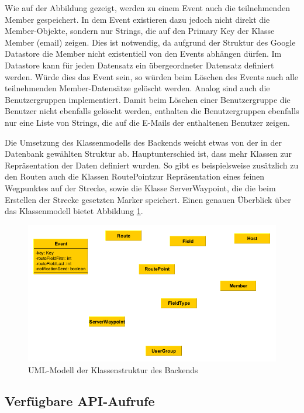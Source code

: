 Wie auf der Abbildung gezeigt, werden zu einem Event auch die teilnehmenden Member gespeichert. In dem Event existieren dazu jedoch nicht direkt die Member-Objekte, sondern nur Strings, die auf den Primary Key der Klasse Member (\glqq email\grqq) zeigen. Dies ist notwendig, da aufgrund der Struktur des Google Datastore die Member nicht existentiell von den Events abhängen dürfen. Im Datastore kann für jeden Datensatz ein übergeordneter Datensatz definiert werden. Würde dies das Event sein, so würden beim Löschen des Events auch alle teilnehmenden Member-Datensätze gelöscht werden. Analog sind auch die Benutzergruppen implementiert. Damit beim Löschen einer Benutzergruppe die Benutzer nicht ebenfalls gelöscht werden, enthalten die Benutzergruppen ebenfalls nur eine Liste von Strings, die auf die E-Mails der enthaltenen Benutzer zeigen.

Die Umsetzung des Klassenmodells des Backends weicht etwas von der in der Datenbank gewählten Struktur ab. Hauptunterschied ist, dass mehr Klassen zur Repräsentation der Daten definiert wurden. So gibt es beispielsweise zusätzlich zu den Routen auch die Klassen \glqq RoutePoint\grqq zur Repräsentation eines feinen Wegpunktes auf der Strecke, sowie die Klasse \glqq ServerWaypoint\grqq, die die beim Erstellen der Strecke gesetzten Marker speichert. Einen genauen Überblick über das Klassenmodell bietet Abbildung \ref{fig:backend_uml}.

\begin{figure}[htb]
\includegraphics[width=\textwidth]{graphics/backend_uml.png}
\caption{UML-Modell der Klassenstruktur des Backends}
\label{fig:backend_uml}
\end{figure}

\subsection{Verfügbare API-Aufrufe}

